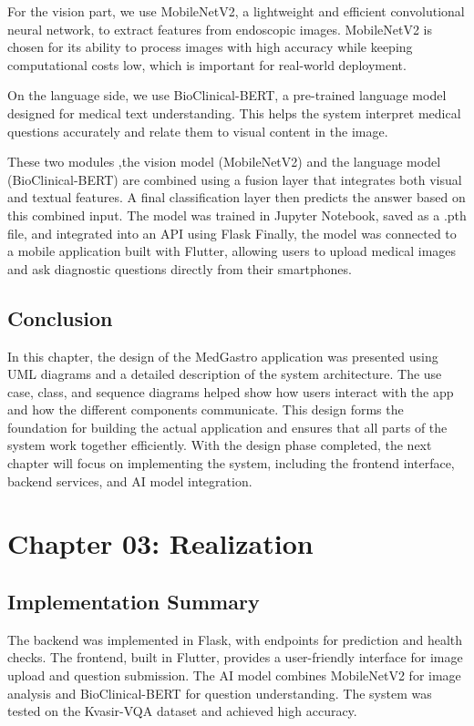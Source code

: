 \documentclass[12pt,a4paper]{report}
\begin{document}
For the vision part, we use MobileNetV2, a lightweight and efficient convolutional neural network, to extract features from endoscopic images. MobileNetV2 is chosen for its ability to process images with high accuracy while keeping computational costs low, which is important for real-world deployment.

On the language side, we use BioClinical-BERT, a pre-trained language model designed for medical text understanding. This helps the system interpret medical questions accurately and relate them to visual content in the image.

These two modules ,the vision model (MobileNetV2) and the language model (BioClinical-BERT)  are combined using a fusion layer that integrates both visual and textual features. A final classification layer then predicts the answer based on this combined input. The model was trained in Jupyter Notebook, saved as a .pth file, and integrated into an API using Flask Finally, the model was connected to a mobile application built with Flutter, allowing users to upload medical images and ask diagnostic questions directly from their smartphones.

\section{Conclusion}
In this chapter, the design of the MedGastro application was presented using UML diagrams and a detailed description of the system architecture. The use case, class, and sequence diagrams helped show how users interact with the app and how the different components communicate. This design forms the foundation for building the actual application and ensures that all parts of the system work together efficiently. With the design phase completed, the next chapter will focus on implementing the system, including the frontend interface, backend services, and AI model integration.

\chapter{Chapter 03: Realization}
\section{Implementation Summary}
The backend was implemented in Flask, with endpoints for prediction and health checks. The frontend, built in Flutter, provides a user-friendly interface for image upload and question submission. The AI model combines MobileNetV2 for image analysis and BioClinical-BERT for question understanding. The system was tested on the Kvasir-VQA dataset and achieved high accuracy.
\end{document}
